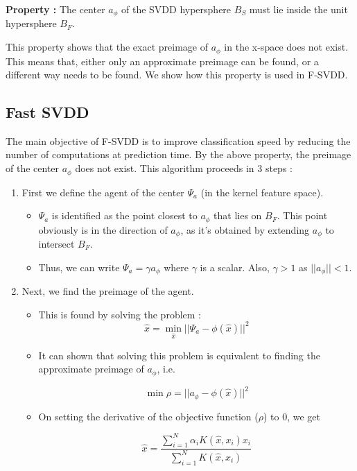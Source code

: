 \documentclass{article}
\begin{document}
\textbf{Property :} The center $a_\phi$ of the SVDD hypersphere $B_S$ must lie inside the unit hypersphere $B_F$.


This property shows that the exact preimage of $a_\phi$ in the x-space does not exist. This means that, either only an approximate preimage can be found, or a different way needs to be found. We show how this property is used in F-SVDD.

\subsection{Fast SVDD}
The main objective of F-SVDD is to improve classification speed by reducing the number of computations at prediction time. By the above property, the preimage of the center $a_\phi$ does not exist. This algorithm proceeds in 3 steps :
\begin{enumerate}
\item First we define the agent of the center $\Psi_a$ (in the kernel feature space).
\begin{itemize}

\item $\Psi_a$ is identified as the point closest to $a_\phi$ that lies on $B_F$. This point obviously is in the direction of $a_\phi$, as it's obtained by extending $a_\phi$ to intersect $B_F$.

\item Thus, we can write $\Psi_a = \gamma a_\phi$ where $\gamma$  is a scalar. Also, $\gamma >1$ as $||a_\phi|| < 1$.

\end{itemize}
\item Next, we find the preimage of the agent. 
\begin{itemize}

\item This is found by solving the problem :
\[ \hat{x} = \min_{\hat{x}} ||\Psi_a - \phi(\hat{x}) ||^2   \]

\item It can shown that solving this problem is equivalent to finding the approximate preimage of $a_\phi$, i.e.

\[ \min \rho = ||a_\phi - \phi(\hat{x}) ||^2 \]

\item On setting the derivative of the objective function ($\rho$) to 0, we get 

\[ \hat{x} = \frac{\sum\limits_{i=1}^N \alpha_i K(\hat{x},x_i)x_i}{\sum\limits_{i=1}^N K(\hat{x},x_i)} \]


\end{itemize}
\end{enumerate}
\end{document}
